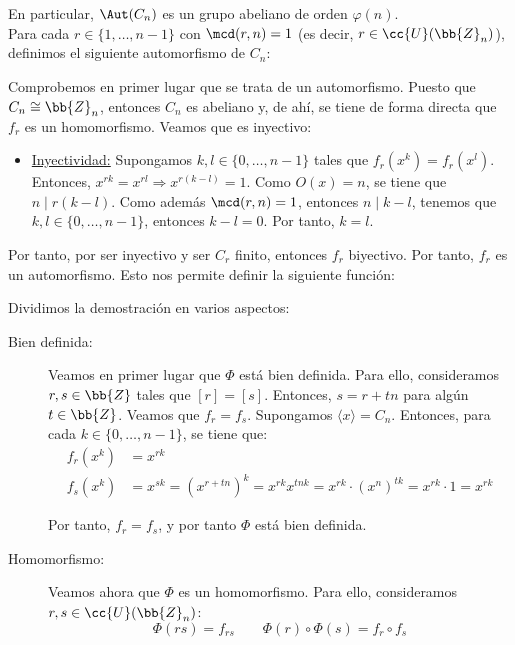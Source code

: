 \begin{ejercicio}
\begin{enumerate}
        En particular, $\Aut(C_n)$ es un grupo abeliano de orden $\varphi(n)$.\\

        Para cada $r\in \{1,\ldots,n-1\}$ con $\mcd(r,n)=1$ (es decir, $r\in \cc{U}(\bb{Z}_n)$), definimos el siguiente automorfismo de $C_n$:

        Comprobemos en primer lugar que se trata de un automorfismo. Puesto que $C_n\cong \bb{Z}_n$, entonces $C_n$ es abeliano y, de ahí, se tiene de forma directa que $f_r$ es un homomorfismo. Veamos que es inyectivo:
        \begin{itemize}
            \item \ul{Inyectividad:} Supongamos $k,l\in \{0,\ldots,n-1\}$ tales que $f_r(x^k)=f_r(x^l)$. Entonces, $x^{rk}=x^{rl}\Longrightarrow x^{r(k-l)}=1$. Como $O(x)=n$, se tiene que  $n\mid r(k-l)$. Como además $\mcd(r,n)=1$, entonces $n\mid k-l$, tenemos que $k,l\in \{0,\ldots,n-1\}$, entonces $k-l=0$. Por tanto, $k=l$.
        \end{itemize}
        Por tanto, por ser inyectivo y ser $C_r$ finito, entonces $f_r$ biyectivo. Por tanto, $f_r$ es un automorfismo. Esto nos permite definir la siguiente función:

        Dividimos la demostración en varios aspectos:
        \begin{description}
            \item[Bien definida:] Veamos en primer lugar que $\Phi$ está bien definida. Para ello, consideramos $r,s\in \bb{Z}$ tales que $[r]=[s]$. Entonces, $s=r+tn$ para algún $t\in \bb{Z}$. Veamos que $f_r=f_s$. Supongamos $\langle x\rangle=C_n$. Entonces, para cada $k\in \{0,\ldots,n-1\}$, se tiene que:
            \begin{align*}
                f_r(x^k) &= x^{rk}\\
                f_s(x^k) &= x^{sk}=\left(x^{r+tn}\right)^k=x^{rk}x^{tnk}=x^{rk}\cdot (x^n)^{tk}=x^{rk}\cdot 1=x^{rk}
            \end{align*}

            Por tanto, $f_r=f_s$, y por tanto $\Phi$ está bien definida.

            \item[Homomorfismo:] Veamos ahora que $\Phi$ es un homomorfismo. Para ello, consideramos $r,s\in \cc{U}(\bb{Z}_n)$:
            \begin{equation*}
                \Phi(rs)=f_{rs}\qquad \Phi(r)\circ \Phi(s)=f_r\circ f_s
            \end{equation*}


\end{description}
\end{enumerate}
\end{ejercicio}
